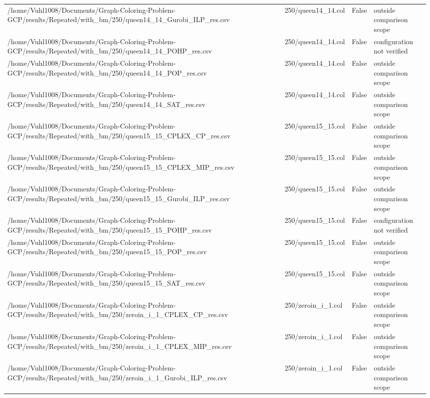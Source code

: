 \begin{table}[htbp]
\begin{tabular}{llll}
/home/Vuhl1008/Documents/Graph-Coloring-Problem-GCP/results/Repeated/with\_bm/250/queen14\_14\_Gurobi\_ILP\_res.csv & 250/queen14\_14.col & False & outside comparison scope \\
/home/Vuhl1008/Documents/Graph-Coloring-Problem-GCP/results/Repeated/with\_bm/250/queen14\_14\_POHP\_res.csv & 250/queen14\_14.col & False & configuration not verified \\
/home/Vuhl1008/Documents/Graph-Coloring-Problem-GCP/results/Repeated/with\_bm/250/queen14\_14\_POP\_res.csv & 250/queen14\_14.col & False & outside comparison scope \\
/home/Vuhl1008/Documents/Graph-Coloring-Problem-GCP/results/Repeated/with\_bm/250/queen14\_14\_SAT\_res.csv & 250/queen14\_14.col & False & outside comparison scope \\
/home/Vuhl1008/Documents/Graph-Coloring-Problem-GCP/results/Repeated/with\_bm/250/queen15\_15\_CPLEX\_CP\_res.csv & 250/queen15\_15.col & False & outside comparison scope \\
/home/Vuhl1008/Documents/Graph-Coloring-Problem-GCP/results/Repeated/with\_bm/250/queen15\_15\_CPLEX\_MIP\_res.csv & 250/queen15\_15.col & False & outside comparison scope \\
/home/Vuhl1008/Documents/Graph-Coloring-Problem-GCP/results/Repeated/with\_bm/250/queen15\_15\_Gurobi\_ILP\_res.csv & 250/queen15\_15.col & False & outside comparison scope \\
/home/Vuhl1008/Documents/Graph-Coloring-Problem-GCP/results/Repeated/with\_bm/250/queen15\_15\_POHP\_res.csv & 250/queen15\_15.col & False & configuration not verified \\
/home/Vuhl1008/Documents/Graph-Coloring-Problem-GCP/results/Repeated/with\_bm/250/queen15\_15\_POP\_res.csv & 250/queen15\_15.col & False & outside comparison scope \\
/home/Vuhl1008/Documents/Graph-Coloring-Problem-GCP/results/Repeated/with\_bm/250/queen15\_15\_SAT\_res.csv & 250/queen15\_15.col & False & outside comparison scope \\
/home/Vuhl1008/Documents/Graph-Coloring-Problem-GCP/results/Repeated/with\_bm/250/zeroin\_i\_1\_CPLEX\_CP\_res.csv & 250/zeroin\_i\_1.col & False & outside comparison scope \\
/home/Vuhl1008/Documents/Graph-Coloring-Problem-GCP/results/Repeated/with\_bm/250/zeroin\_i\_1\_CPLEX\_MIP\_res.csv & 250/zeroin\_i\_1.col & False & outside comparison scope \\
/home/Vuhl1008/Documents/Graph-Coloring-Problem-GCP/results/Repeated/with\_bm/250/zeroin\_i\_1\_Gurobi\_ILP\_res.csv & 250/zeroin\_i\_1.col & False & outside comparison scope \\

\end{tabular}
\end{table}
